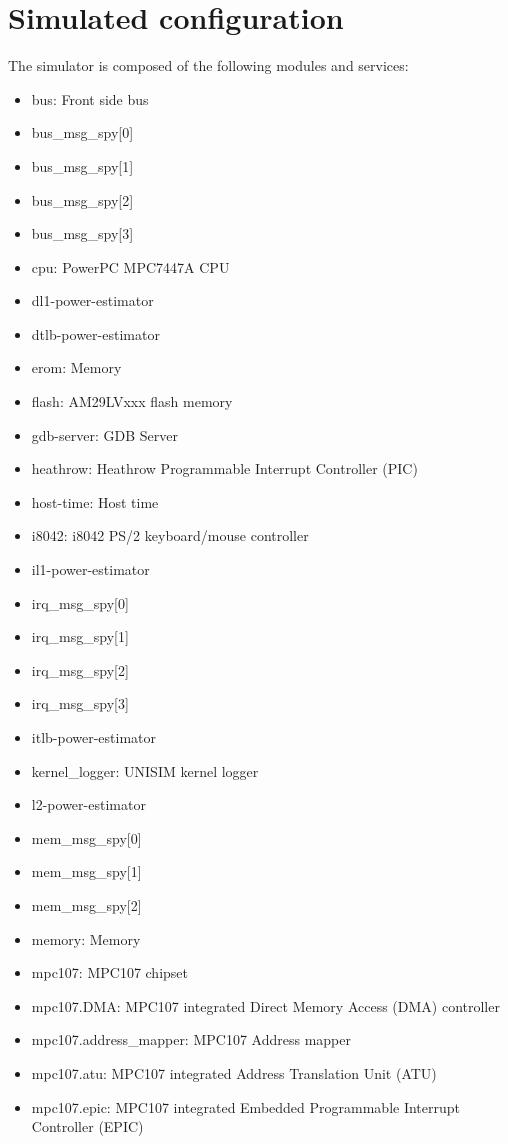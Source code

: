 \section{Simulated configuration}
\noindent The simulator is composed of the following modules and services:
\begin{itemize}\addtolength{\itemsep}{-0.40\baselineskip}
\item bus: Front side bus
\item bus\_msg\_spy[0]
\item bus\_msg\_spy[1]
\item bus\_msg\_spy[2]
\item bus\_msg\_spy[3]
\item cpu: PowerPC MPC7447A CPU
\item dl1-power-estimator
\item dtlb-power-estimator
\item erom: Memory
\item flash: AM29LVxxx flash memory
\item gdb-server: GDB Server
\item heathrow: Heathrow Programmable Interrupt Controller (PIC)
\item host-time: Host time
\item i8042: i8042 PS/2 keyboard/mouse controller
\item il1-power-estimator
\item irq\_msg\_spy[0]
\item irq\_msg\_spy[1]
\item irq\_msg\_spy[2]
\item irq\_msg\_spy[3]
\item itlb-power-estimator
\item kernel\_logger: UNISIM kernel logger
\item l2-power-estimator
\item mem\_msg\_spy[0]
\item mem\_msg\_spy[1]
\item mem\_msg\_spy[2]
\item memory: Memory
\item mpc107: MPC107 chipset
\item mpc107.DMA: MPC107 integrated Direct Memory Access (DMA) controller
\item mpc107.address\_mapper: MPC107 Address mapper
\item mpc107.atu: MPC107 integrated Address Translation Unit (ATU)
\item mpc107.epic: MPC107 integrated Embedded Programmable Interrupt Controller (EPIC)

\end{itemize}

